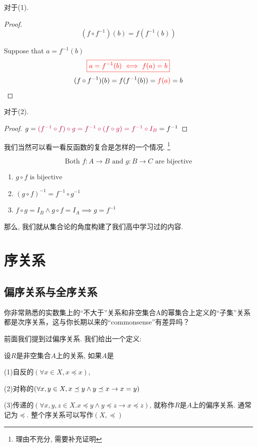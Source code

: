 对于(1). 
\begin{proof}
  \[
    (f \circ f^{-1})(b) = f(f^{-1}(b))
  \]

    Suppose that $a = f^{-1}(b)$
    \[
      \textcolor{red}{\boxed{a = f^{-1}(b) \iff f(a) = b}}
    \]
    \[
    (f \circ f^{-1})(b) = f(f^{-1}(b)) = \textcolor{red}{f(a)} = b
  \]
\end{proof}

对于(2).
\begin{proof}
  $g = \textcolor{purple}{(f^{-1} \circ f) \circ g = f^{-1} \circ (f \circ g) = f^{-1} \circ I_B} = f^{-1}$
\end{proof}

我们当然可以看一看反函数的复合是怎样的一个情况. \footnote{理由不充分, 需要补充证明}

\begin{theorem}
  \[
    \text{Both } f: A \to B \text{ and } g: B \to C \text{ are bijective}
  \]

  \begin{enumerate}
    \item $g \circ f \text{ is bijective}$
    \item $(g \circ f)^{-1} = f^{-1} \circ g^{-1}$
    \item $f \circ g = I_B \land g \circ f = I_A \implies g = f^{-1}$
  \end{enumerate}
\end{theorem}

那么, 我们就从集合论的角度构建了我们高中学习过的内容. 

\section{序关系}

\subsection{偏序关系与全序关系}

\begin{dialogue}
	你非常熟悉的实数集上的“不大于”关系和非空集合A的幂集合上定义的“子集”关系都是次序关系，这与你长期以来的“commonsense”有差异吗？
\end{dialogue}

前面我们提到过偏序关系. 我们给出一个定义: 

\begin{definition}
	设$R$是非空集合$A$上的关系, 如果$A$是
	
	(1)自反的$(\forall x\in X, x \preceq x)$, 
	
	(2)对称的$(\forall x,y \in X, x \preceq y \land y\preceq x \to x=y)$
	
	(3)传递的$(\forall x,y,z\in X. x \preceq y \land y \preceq z \to x\preceq z)$, 就称作$R$是$A$上的偏序关系. 通常记为$\preceq$. 整个序关系可以写作$(X,\preceq)$
\end{definition}

